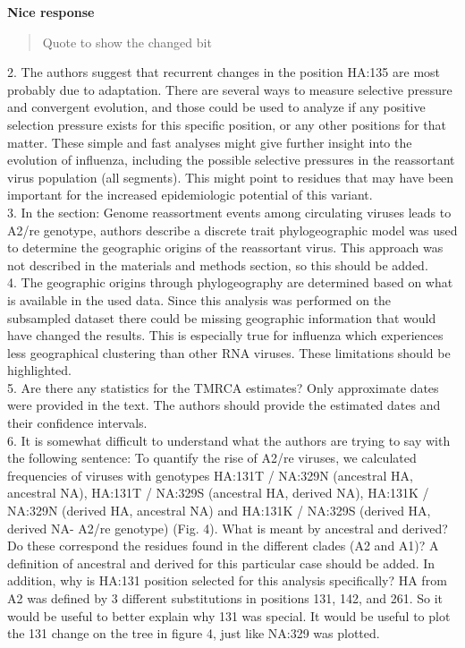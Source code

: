 \documentclass[11pt,oneside,letterpaper]{article}
\begin{document}
\textbf{Nice response}

\begin{quotation}
Quote to show the changed bit
\end{quotation}

2. The authors suggest that recurrent changes in the position HA:135 are most probably due to adaptation. There are several ways to measure selective pressure and convergent evolution, and those could be used to analyze if any positive selection pressure exists for this specific position, or any other positions for that matter. These simple and fast analyses might give further insight into the evolution of influenza, including the possible selective pressures in the reassortant virus population (all segments). This might point to residues that may have been important for the increased epidemiologic potential of this variant.\\

3. In the section: Genome reassortment events among circulating viruses leads to A2/re genotype, authors describe a discrete trait phylogeographic model was used to determine the geographic origins of the reassortant virus. This approach was not described in the materials and methods section, so this should be added.\\

4. The geographic origins through phylogeography are determined based on what is available in the used data. Since this analysis was performed on the subsampled dataset there could be missing geographic information that would have changed the results. This is especially true for influenza which experiences less geographical clustering than other RNA viruses. These limitations should be highlighted.\\

5. Are there any statistics for the TMRCA estimates? Only approximate dates were provided in the text. The authors should provide the estimated dates and their confidence intervals.\\

6. It is somewhat difficult to understand what the authors are trying to say with the following sentence: To quantify the rise of A2/re viruses, we calculated frequencies of viruses with genotypes HA:131T / NA:329N (ancestral HA, ancestral NA), HA:131T / NA:329S (ancestral HA, derived NA), HA:131K / NA:329N (derived HA, ancestral NA) and HA:131K / NA:329S (derived HA, derived NA- A2/re genotype) (Fig. 4). What is meant by ancestral and derived? Do these correspond the residues found in the different clades (A2 and A1)? A definition of ancestral and derived for this particular case should be added. In addition, why is HA:131 position selected for this analysis specifically? HA from A2 was defined by 3 different substitutions in positions 131, 142, and 261. So it would be useful to better explain why 131 was special. It would be useful to plot the 131 change on the tree in figure 4, just like NA:329 was plotted.\\
\end{document}

